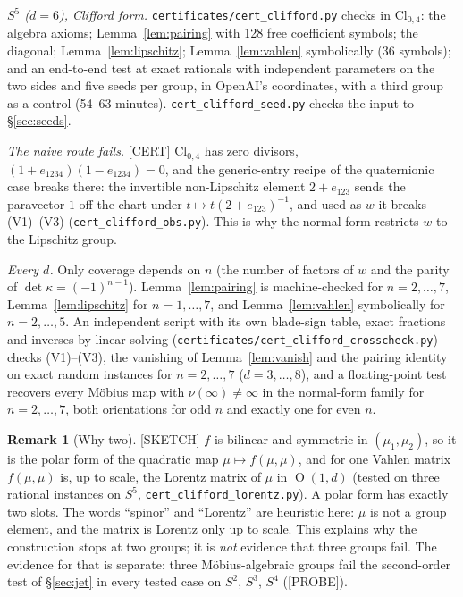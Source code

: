 \documentclass[11pt]{amsart}
\newcommand{\st}[1]{\textsf{[#1]}}
\newcommand{\Cl}{\mathrm{Cl}}
\DeclareMathOperator{\Ort}{O}
\theoremstyle{plain}
\theoremstyle{definition}
\newtheorem{remark}[theorem]{Remark}
\begin{document}
\noindent\emph{$S^5$ ($d=6$), Clifford form.} \texttt{certificates/cert\_clifford.py} checks in
$\Cl_{0,4}$: the algebra axioms; Lemma~\ref{lem:pairing} with 128 free coefficient symbols; the
diagonal; Lemma~\ref{lem:lipschitz}; Lemma~\ref{lem:vahlen} symbolically (36 symbols); and an
end-to-end test at exact rationals with independent parameters on the two sides and five seeds per
group, in OpenAI's coordinates, with a third group as a control (54--63 minutes).
\texttt{cert\_clifford\_seed.py} checks the input to \S\ref{sec:seeds}.

\noindent\emph{The naive route fails.} \st{CERT} $\Cl_{0,4}$ has zero divisors,
$(1+e_{1234})(1-e_{1234})=0$, and the generic-entry recipe of the quaternionic case breaks there: the
invertible non-Lipschitz element $2+e_{123}$ sends the paravector $1$ off the chart under $t\mapsto
t(2+e_{123})^{-1}$, and used as $w$ it breaks (V1)--(V3) (\texttt{cert\_clifford\_obs.py}). This is
why the normal form restricts $w$ to the Lipschitz group.

\noindent\emph{Every $d$.} Only coverage depends on $n$ (the number of factors of $w$ and the parity
of $\det\kappa=(-1)^{n-1}$). Lemma~\ref{lem:pairing} is machine-checked for $n=2,\dots,7$,
Lemma~\ref{lem:lipschitz} for $n=1,\dots,7$, and Lemma~\ref{lem:vahlen} symbolically for $n=2,\dots,5$.
An independent script with its own blade-sign table, exact fractions and inverses by linear solving
(\texttt{certificates/cert\_clifford\_crosscheck.py}) checks (V1)--(V3), the vanishing of
Lemma~\ref{lem:vanish} and the pairing identity on exact random instances for $n=2,\dots,7$
($d=3,\dots,8$), and a floating-point test recovers every M\"obius map with $\nu(\infty)\ne\infty$ in
the normal-form family for $n=2,\dots,7$, both orientations for odd $n$ and exactly one for even $n$.

\begin{remark}[Why two]\label{rem:whytwo}
\st{SKETCH} $f$ is bilinear and symmetric in $(\mu_1,\mu_2)$, so it is the polar form of the quadratic
map $\mu\mapsto f(\mu,\mu)$, and for one Vahlen matrix $f(\mu,\mu)$ is, up to scale, the Lorentz
matrix of $\mu$ in $\Ort(1,d)$ (tested on three rational instances on $S^5$,
\texttt{cert\_clifford\_lorentz.py}). A polar form has exactly two slots. The words ``spinor'' and
``Lorentz'' are heuristic here: $\mu$ is not a group element, and the matrix is Lorentz only up to
scale. This explains why the construction stops at two groups; it is \emph{not} evidence that three
groups fail. The evidence for that is separate: three M\"obius-algebraic groups fail the second-order
test of \S\ref{sec:jet} in every tested case on $S^2$, $S^3$, $S^4$ (\st{PROBE}).
\end{remark}
\end{document}

